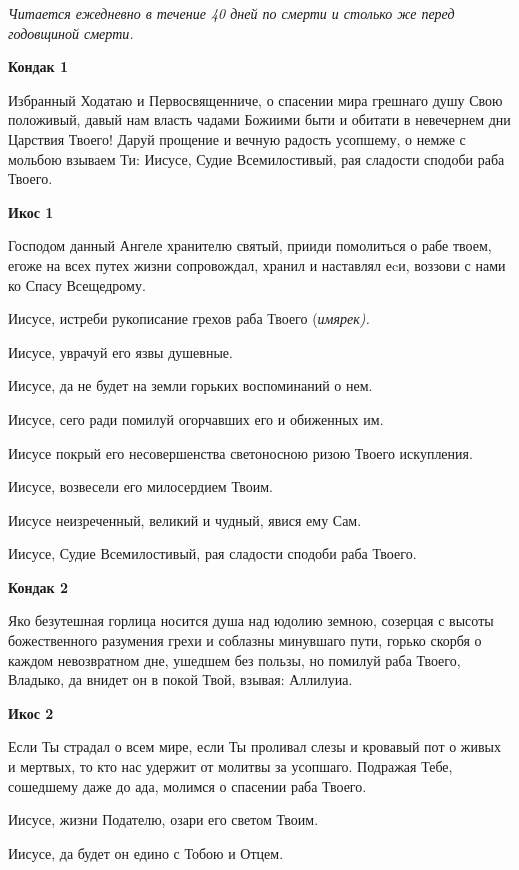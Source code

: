 \itshape Читается ежедневно в течение 40 дней по смерти и столько же перед годовщиной смерти.\normalfont{} 

\bfseries Кондак 1 

\normalfont{}Избранный Ходатаю и Первосвященниче, о спасении мира грешнаго душу Свою положивый, давый нам власть чадами Божиими быти и обитати в невечернем дни Царствия Твоего! Даруй прощение и вечную радость усопшему, о немже с мольбою взываем Ти: Иисусе, Судие Всемилостивый, рая сладости сподоби раба Твоего.


\medskip


\bfseries Икос 1\normalfont{}


Господом данный Ангеле хранителю святый, прииди помолиться о рабе твоем, егоже на всех путех жизни сопровождал, хранил и наставлял еcи, воззови с нами ко Спасу Всещедрому. 

Иисусе, истреби рукописание грехов раба Твоего (\itshape имярек\normalfont{}). 

Иисусе, уврачуй его язвы душевные. 

Иисусе, да не будет на земли горьких воспоминаний о нем. 

Иисусе, сего ради помилуй огорчавших его и обиженных им. 

Иисусе покрый его несовершенства светоносною ризою Твоего искупления. 

Иисусе, возвесели его милосердием Твоим. 

Иисусе неизреченный, великий и чудный, явися ему Сам. 

Иисусе, Судие Всемилостивый, рая сладости сподоби раба Твоего.


\medskip


\bfseries Кондак 2\normalfont{}


Яко безутешная горлица носится душа над юдолию земною, созерцая с высоты божественного разумения грехи и соблазны минувшаго пути, горько скорбя о каждом невозвратном дне, ушедшем без пользы, но помилуй раба Твоего, Владыко, да внидет он в покой Твой, взывая: Аллилуиа.


\medskip


\bfseries Икос 2\normalfont{}


Если Ты страдал о всем мире, если Ты проливал слезы и кровавый пот о живых и мертвых, то кто нас удержит от молитвы за усопшаго. Подражая Тебе, сошедшему даже до ада, молимся о спасении раба Твоего. 

Иисусе, жизни Подателю, озари его светом Твоим. 

Иисусе, да будет он едино с Тобою и Отцем. 

